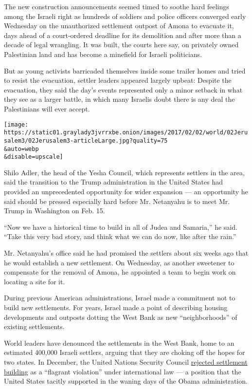 The new construction announcements seemed timed to soothe hard feelings
among the Israeli right as hundreds of soldiers and police officers
converged early Wednesday on the unauthorized settlement outpost of
Amona to evacuate it, days ahead of a court-ordered deadline for its
demolition and after more than a decade of legal wrangling. It was
built, the courts here say, on privately owned Palestinian land and has
become a minefield for Israeli politicians.

But as young activists barricaded themselves inside some trailer homes
and tried to resist the evacuation, settler leaders appeared largely
upbeat: Despite the evacuation, they said the day's events represented
only a minor setback in what they see as a larger battle, in which many
Israelis doubt there is any deal the Palestinians will ever accept.

\texttt{[image: https://static01.graylady3jvrrxbe.onion/images/2017/02/02/world/02Jerusalem3/02Jerusalem3-articleLarge.jpg?quality=75\\\&auto=webp\\\&disable=upscale]}

Shilo Adler, the head of the Yesha Council, which represents settlers in
the area, said the transition to the Trump administration in the United
States had provided an unprecedented opportunity for wider expansion ---
an opportunity he said should be pressed especially hard before Mr.
Netanyahu is to meet Mr. Trump in Washington on Feb. 15.

``Now we have a historical time to build in all of Judea and Samaria,''
he said. ``Take this very bad story, and think what we can do now, like
after the rain.''

Mr. Netanyahu's office said he had promised the settlers about six weeks
ago that he would establish a new settlement. On Wednesday, as another
sweetener to compensate for the removal of Amona, he appointed a team to
begin work on locating a site for it.

During previous American administrations, Israel made a commitment not
to build new settlements. For years, Israel made a point of describing
housing developments and outposts dotting the West Bank as new
``neighborhoods'' of existing settlements.

World leaders have denounced the settlements in the West Bank, home to
an estimated 400,000 Israeli settlers, arguing that they are choking off
the hopes for two states. In December, the United Nations Security
Council
\href{https://www.nytimes3xbfgragh.onion/2016/12/23/world/middleeast/israel-settlements-un-vote.html}{rejected
settlement building} as a ``flagrant violation'' under international law
--- a position that the United States tacitly supported in the waning
days of the Obama administration.

